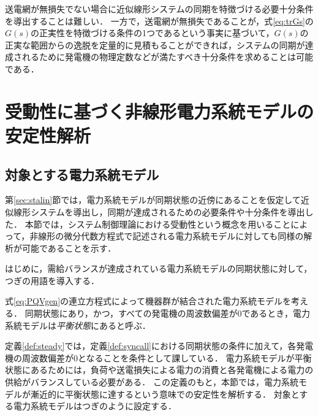 \documentclass[a4j,10pt,oneside,openany,dvipdfmx]{jsbook}
\begin{document}
送電網が無損失でない場合に近似線形システムの同期を特徴づける必要十分条件を導出することは難しい．
一方で，送電網が無損失であることが，式\eqref{eq:trGs}の$G(s)$の正実性を特徴づける条件の1つであるという事実に基づいて，$G(s)$の正実な範囲からの逸脱を定量的に見積もることができれば，システムの同期が達成されるために発電機の物理定数などが満たすべき十分条件を求めることは可能である．


\section{受動性に基づく非線形電力系統モデルの安定性解析}

\subsection{対象とする電力系統モデル}\label{sec:objmod}

第\ref{sec:stalin}節では，電力系統モデルが同期状態の近傍にあることを仮定して近似線形システムを導出し，同期が達成されるための必要条件や十分条件を導出した．
本節では，システム制御理論における受動性という概念を用いることによって，非線形の微分代数方程式で記述される電力系統モデルに対しても同様の解析が可能であることを示す．

はじめに，需給バランスが達成されている電力系統モデルの同期状態に対して，つぎの用語を導入する．

\begin{definition}\label{def:steady}
式\eqref{eq:PQVgen}の連立方程式によって機器群が結合された電力系統モデルを考える．
同期状態にあり，かつ，すべての発電機の周波数偏差が0であるとき，電力系統モデルは\emph{平衡状態}にあると呼ぶ．
\end{definition}

定義\ref{def:steady}では，定義\ref{def:syncall}における同期状態の条件に加えて，各発電機の周波数偏差が0となることを条件として課している．
電力系統モデルが平衡状態にあるためには，負荷や送電損失による電力の消費と各発電機による電力の供給がバランスしている必要がある．
この定義のもと，本節では，電力系統モデルが漸近的に平衡状態に達するという意味での安定性を解析する．
対象とする電力系統モデルはつぎのように設定する．
\end{document}
